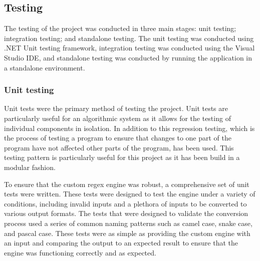 \subsection{Testing}

The testing of the project was conducted in three main stages: unit testing; integration testing; and standalone testing. The unit testing was conducted using .NET Unit testing framework, integration testing was conducted using the Visual Studio IDE, and standalone testing was conducted by running the application in a standalone environment.

\subsubsection{Unit testing}
Unit tests were the primary method of testing the project. Unit tests are particularly useful for an algorithmic system as it allows for the testing of individual components in isolation. In addition to this regression testing, which is the process of testing a program to ensure that changes to one part of the program have not affected other parts of the program, has been used. This testing pattern is particularly useful for this project as it has been build in a modular fashion.

To ensure that the custom regex engine was robust, a comprehensive set of unit tests were written. These tests were designed to test the engine under a variety of conditions, including invalid inputs and a plethora of inputs to be converted to various output formats. The tests that were designed to validate the conversion process used a series of common naming patterns such as camel case, snake case, and pascal case. These tests were as simple as providing the custom engine with an input and comparing the output to an expected result to ensure that the engine was functioning correctly and as expected.

